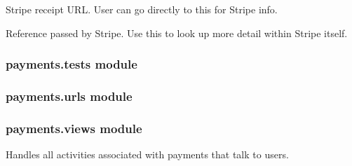 \documentclass[letterpaper,10pt,english]{sphinxmanual}
\begin{document}
\begin{fulllineitems}

\begin{fulllineitems}
\label{\detokenize{payments:payments.models.StripeTransaction.stripe_receipt_url}}
Stripe receipt URL. User can go directly to this for Stripe info.

\end{fulllineitems}


\begin{fulllineitems}
\label{\detokenize{payments:payments.models.StripeTransaction.stripe_reference}}
Reference passed by Stripe. Use this to look up more detail within
Stripe itself.

\end{fulllineitems}


\end{fulllineitems}



\subsubsection{payments.tests module}
\label{\detokenize{payments:module-payments.tests}}\label{\detokenize{payments:payments-tests-module}}

\subsubsection{payments.urls module}
\label{\detokenize{payments:module-payments.urls}}\label{\detokenize{payments:payments-urls-module}}

\subsubsection{payments.views module}
\label{\detokenize{payments:module-payments.views}}\label{\detokenize{payments:payments-views-module}}
Handles all activities associated with payments that talk to users.
\end{document}
